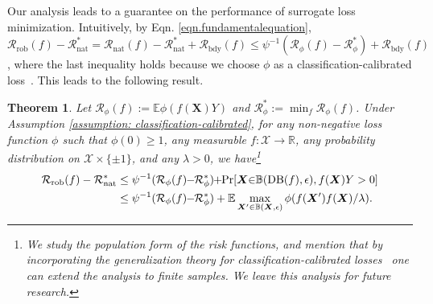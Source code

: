 \documentclass[11pt]{article}
\newcommand{\adv}{\mathrm{rob}}
\newcommand{\nat}{\mathrm{nat}}
\newcommand{\boundary}{\mathrm{DB}}
\newtheorem{theorem}{Theorem}[section]
\newtheorem{remark}{Remark}
\newcommand{\R}{\mathbb{R}}
\newcommand{\X}{\bm{X}}
\newcommand{\0}{\mathbf{0}}
\newcommand{\1}{\mathbf{1}}
\renewcommand{\comment}[1]{}
\newcommand{\cR}{\mathcal{R}}
\newcommand{\cX}{\mathcal{X}}
\newcommand{\bbB}{\mathbb{B}}
\newcommand{\bbE}{\mathbb{E}}
\begin{document}
Our analysis leads to a guarantee on the performance of surrogate loss minimization. Intuitively, by Eqn. \eqref{eqn.fundamentalequation}, $\cR_{\adv}(f)-\cR_{\nat}^*=\cR_\nat(f)-\cR_{\nat}^*+\cR_{\text{bdy}}(f)\le \psi^{-1}(\cR_\phi(f)-\cR_\phi^*)+\cR_{\text{bdy}}(f)$, where the last inequality holds because we choose $\phi$ as a classification-calibrated loss~\cite{bartlett2006convexity}. This leads to the following result.



\begin{theorem}
\label{theorem: surrogate function}
Let $\cR_\phi(f):=\bbE\phi(f(\X)Y)$ and $\cR_\phi^*:=\min_f \cR_\phi(f)$. Under Assumption \ref{assumption: classification-calibrated}, for any non-negative loss function $\phi$ such that $\phi(0)\ge 1$, any measurable $f:\cX\rightarrow \R$, any probability distribution on $\cX\times\{\pm 1\}$, and any $\lambda>0$, we have\footnote{We study the population form of the risk functions, and mention that by incorporating the generalization theory for classification-calibrated losses~\cite{bartlett2006convexity} one can extend the analysis to finite samples. We leave this analysis for future research.}
\begin{equation*}\vspace{-0.3cm}
\begin{split}
\cR_\adv(f)-\cR_\nat^*&\le \psi^{-1}(\cR_\phi(f)\hspace{-0.1cm}-\hspace{-0.1cm}\cR_\phi^*)\hspace{-0.1cm}+\hspace{-0.1cm}\Pr[\X\hspace{-0.1cm}\in\hspace{-0.1cm}\bbB(\boundary(f),\epsilon),f(\X)Y>0]\\
&\le \psi^{-1}(\cR_\phi(f)\hspace{-0.1cm}-\hspace{-0.1cm}\cR_\phi^*)+\bbE \max_{\X'\in\bbB(\X,\epsilon)}\phi(f(\X')f(\X)/\lambda).
\end{split}
\end{equation*}
\end{theorem}

\comment{
\begin{remark}
When $g$ is a linear classifier going through origin and $X$ is drawn from isotropic log-concave distribution, we know that~\cite{awasthi2016learning}
\begin{equation}
\Pr[X\in\bbB(\boundary(g),\epsilon)]=\Theta(\epsilon).
\end{equation}
So linear classifier is robust. The reason why deep neural network is vulnerable to adversarial attack is that $\Pr[X\in\bbB(\boundary(g),\epsilon)]$ is large as the decision boundary is very complicated.
\end{remark}
}
\end{document}
